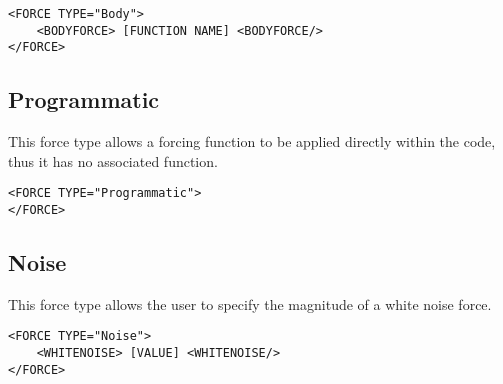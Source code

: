 \begin{lstlisting}[style=XMLStyle] 
<FORCE TYPE="Body">
    <BODYFORCE> [FUNCTION NAME] <BODYFORCE/>
</FORCE>
\end{lstlisting}

\subsection{Programmatic}
This force type allows a forcing function to be applied directly within the code, thus it has no associated function. 

\begin{lstlisting}[style=XMLStyle] 
<FORCE TYPE="Programmatic">
</FORCE>
\end{lstlisting}


\subsection{Noise}
This force type allows the user to specify the magnitude of a white noise force. 

\begin{lstlisting}[style=XMLStyle] 
<FORCE TYPE="Noise">
    <WHITENOISE> [VALUE] <WHITENOISE/>
</FORCE>
\end{lstlisting}









